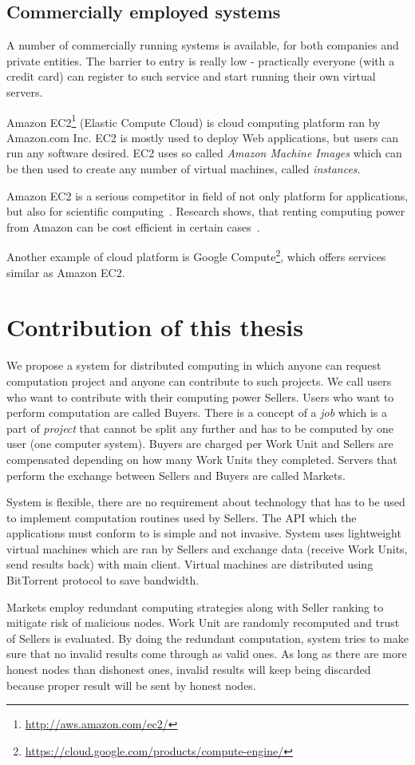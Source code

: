 \subsection{Commercially employed systems}
\label{s:comercial_sys}

A number of commercially running systems is available, for both companies and private entities. The barrier to entry is really low - practically everyone (with a credit card) can register to such service and start running their own virtual servers.

Amazon EC2\footnote{\url{http://aws.amazon.com/ec2/}} (Elastic Compute Cloud) is cloud computing platform ran by Amazon.com Inc. EC2 is mostly used to deploy Web applications, but users can run any software desired. EC2 uses so called \emph{Amazon Machine Images} which can be then used to create any number of virtual machines, called \emph{instances}.

Amazon EC2 is a serious competitor in field of not only platform for applications, but also for scientific computing~\cite{walker2008benchmarking}. Research shows, that renting computing power from Amazon can be cost efficient in certain cases~\cite{berriman2013application}.

Another example of cloud platform is Google Compute\footnote{\url{https://cloud.google.com/products/compute-engine/}}, which offers services similar as Amazon EC2.

\section{Contribution of this thesis}

We propose a system for distributed computing in which anyone can request computation project and anyone can contribute to such projects. We call users who want to contribute with their computing power Sellers. Users who want to perform computation are called Buyers. There is a concept of a \emph{job} which is a part of \emph{project} that cannot be split any further and has to be computed by one user (one computer system). Buyers are charged per Work Unit and Sellers are compensated depending on how many Work Units they completed. Servers that perform the exchange between Sellers and Buyers are called Markets.

System is flexible, there are no requirement about technology that has to be used to implement computation routines used by Sellers. The API which the applications must conform to is simple and not invasive. System uses lightweight virtual machines which are ran by Sellers and exchange data (receive Work Units, send results back) with main client. Virtual machines are distributed using BitTorrent protocol to save bandwidth.

Markets employ redundant computing strategies along with Seller ranking to mitigate risk of malicious nodes. Work Unit are randomly recomputed and trust of Sellers is evaluated. By doing the redundant computation, system tries to make sure that no invalid results come through as valid ones. As long as there are more honest nodes than dishonest ones, invalid results will keep being discarded because proper result will be sent by honest nodes.
